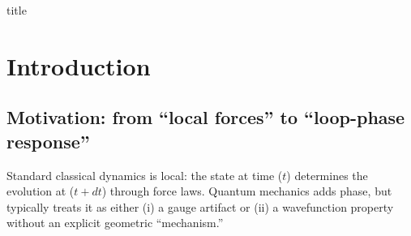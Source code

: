 ﻿\documentclass[twocolumn,aps,prd,nofootinbib]{revtex4-2}
\begin{document}
\csname title
\author{Divyang Panchasara}
\date{\today}

\begin{abstract}
We present the X--$\theta$ framework: an effective geometric extension in which an internal compact phase coordinate $\theta$ is transported by a U(1) connection over spacetime. The central observable is a loop-phase response, quantified by the transport phase
\begin{equation}
\Delta\theta_{\mathrm{loop}}(\gamma)=-\kappa\oint_\gamma A\quad(\mathrm{mod}\,2\pi),
\end{equation}
which depends primarily on loop geometry (flux/area/winding) rather than traversal time. We formulate the gauge-invariant bundle/St\"uckelberg structure, relate it to Wilson loops and geometric phase, and outline how standard covariant derivatives arise from dimensional reduction on an $S^1$ fiber. A minimal 4D completion includes an explicit St\"uckelberg kinetic term $\tfrac{f^2}{2}(\partial_\mu\theta+\kappa A_\mu)^2$, which provides dynamics for the phase field and induces a mediator mass scale. We propose a three-tier validation suite (simulation, tabletop analogs, and open-data stress tests) with explicit falsifiers for numerical artifacts and speed-dominated drift. Consistency constraints are discussed, including Yukawa-suppressed long-range deviations to preserve agreement with solar-system gravity. We emphasize that Bell-violating correlations, if reproduced, require an explicit relaxation of at least one Bell assumption; the framework provides language for such hypotheses but no automatic loophole. Relativistic and cosmological extensions are presented as consistency checks and future-facing consequences, not as required premises.
\end{abstract}

\maketitle

\section{Introduction}

\subsection{Motivation: from ``local forces'' to ``loop-phase response''}
Standard classical dynamics is local: the state at time ($t$) determines the evolution at ($t+dt$) through force laws. Quantum mechanics adds phase, but typically treats it as either (i) a gauge artifact or (ii) a wavefunction property without an explicit geometric ``mechanism.''
\end{document}
